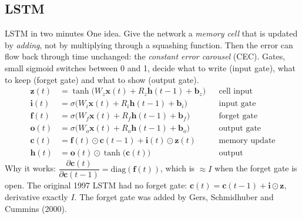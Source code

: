 \subsection{LSTM}

\begin{summary}{LSTM in two minutes}
\textsf{One idea.} Give the network a \emph{memory cell} that is updated by \emph{adding}, not by
multiplying through a squashing function. Then the error can flow back through time unchanged:
the \emph{constant error carousel} (CEC). Gates, small sigmoid switches between 0 and 1, decide
what to write (input gate), what to keep (forget gate) and what to show (output gate).
\[
\begin{aligned}
\mathbf{z}(t)&=\tanh\bigl(W_z\mathbf{x}(t)+R_z\mathbf{h}(t-1)+\mathbf{b}_z\bigr)&&\text{cell input}\\
\mathbf{i}(t)&=\sigma\bigl(W_i\mathbf{x}(t)+R_i\mathbf{h}(t-1)+\mathbf{b}_i\bigr)&&\text{input gate}\\
\mathbf{f}(t)&=\sigma\bigl(W_f\mathbf{x}(t)+R_f\mathbf{h}(t-1)+\mathbf{b}_f\bigr)&&\text{forget gate}\\
\mathbf{o}(t)&=\sigma\bigl(W_o\mathbf{x}(t)+R_o\mathbf{h}(t-1)+\mathbf{b}_o\bigr)&&\text{output gate}\\
\mathbf{c}(t)&=\mathbf{f}(t)\odot\mathbf{c}(t-1)+\mathbf{i}(t)\odot\mathbf{z}(t)&&\text{memory update}\\
\mathbf{h}(t)&=\mathbf{o}(t)\odot\tanh\bigl(\mathbf{c}(t)\bigr)&&\text{output}
\end{aligned}
\]
\textsf{Why it works:} $\dfrac{\partial\mathbf{c}(t)}{\partial\mathbf{c}(t-1)}=\mathrm{diag}(\mathbf{f}(t))$,
which is $\approx I$ when the forget gate is open. The original 1997 LSTM had no forget gate:
$\mathbf{c}(t)=\mathbf{c}(t-1)+\mathbf{i}\odot\mathbf{z}$, derivative exactly $I$. The forget gate
was added by Gers, Schmidhuber and Cummins (2000).
\end{summary}



